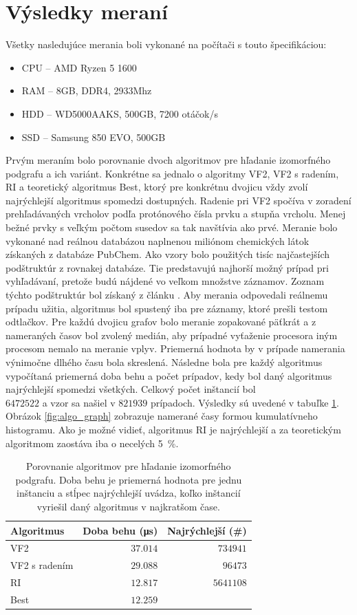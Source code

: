 \documentclass[slovak]{ExcelAtFIT} %
\begin{document}
\section{Výsledky meraní}
\label{sec:Results}
Všetky nasledujúce merania boli vykonané na počítači s touto špecifikáciou:
\begin{itemize}
	\item CPU -- AMD Ryzen 5 1600
	\item RAM -- 8GB, DDR4, 2933Mhz
	\item HDD -- WD5000AAKS, 500GB, 7200 otáčok/s
	\item SSD -- Samsung 850 EVO, 500GB
\end{itemize}
Prvým meraním bolo porovnanie dvoch algoritmov pre hľadanie izomorfného podgrafu a ich variánt. Konkré\-tne sa jednalo o algoritmy VF2, VF2 s radením, RI a teoretický algoritmus Best, ktorý pre konkrétnu dvojicu vždy zvolí najrýchlejší algoritmus spomedzi dostupných. Radenie pri VF2 spočíva v zoradení pre\-hľa\-dá\-va\-ný\-ch vrcholov podľa protónového čísla prvku a stupňa vrcholu. Menej bežné prvky s veľkým počtom susedov sa tak navštívia ako prvé. Meranie bolo vykonané nad reálnou databázou naplnenou miliónom chemických látok získaných z databáze PubChem. Ako vzory bolo použitých tisíc najčastejších podštruktúr z rovnakej databáze. Tie predstavujú najhorší možný prípad pri vyhľadávaní, pretože budú nájdené vo veľ\-kom množstve záznamov. Zoznam týchto podštruktúr bol získaný z článku \cite{mol_cloud}. Aby merania odpovedali reálnemu prípadu užitia, algoritmus bol spustený iba pre záznamy, ktoré prešli testom odtlačkov. Pre každú dvojicu grafov bolo meranie zopakované päťkrát a z nameraných časov bol zvolený medián, aby prípadné vyťaženie procesora iným procesom nemalo na meranie vplyv. Priemerná hodnota by v prípade namerania výnimočne dlhého času bola skreslená. Následne bola pre každý algoritmus vypočítaná priemerná doba behu a počet prípadov, kedy bol daný algoritmus najrýchlejší spomedzi všet\-kých. Celkový počet inštancií bol\\$6472522$ a vzor sa našiel v $821939$ prípadoch. Výsledky sú uvedené v tabuľke \ref{tab:algo_meas}. Obrázok \ref{fig:algo_graph} zobrazuje namerané časy formou kumulatívneho histogramu. Ako je možné vidieť, algoritmus RI je najrýchlejší a za teoretickým algoritmom zaostáva iba o necelých \SI{5}{\percent}.

\begin{table}[h]
	\vskip6pt
	\caption{Porovnanie algoritmov pre hľadanie izomorfného podgrafu. Doba behu je priemerná hodnota pre jednu inštanciu a stĺpec najrýchlejší uvádza, koľko inštancií vyriešil daný algoritmus v najkratšom čase.}
	\centering
	\begin{tabular}{l|r|r}
		\toprule
		Algoritmus & Doba behu (\si{\micro \second}) & Najrýchlejší (\#)\\
		\midrule
		VF2 & $37.014$ & $734941$ \\
		VF2 s radením & $29.088$ & $96473$ \\
		RI & $12.817$ & $5641108$ \\
		Best & $12.259$ & \\
		\bottomrule
	\end{tabular}
	\label{tab:algo_meas}
\end{table}
\end{document}
